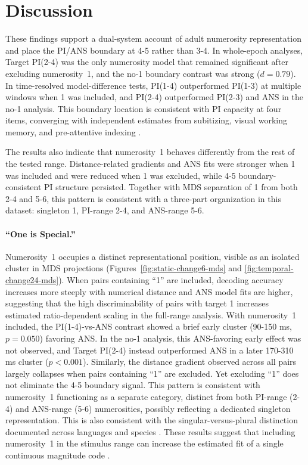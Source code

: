 \section{Discussion}
These findings support a dual-system account of adult numerosity
representation and place the PI/ANS boundary at 4-5 rather than 3-4.
In whole-epoch analyses, Target PI(2-4) was the only numerosity model
that remained significant after excluding numerosity~1, and the no-1
boundary contrast was strong ($d = 0.79$). In time-resolved
model-difference tests, PI(1-4) outperformed PI(1-3) at multiple
windows when 1 was included, and PI(2-4) outperformed PI(2-3) and ANS
in the no-1 analysis. This boundary location is consistent with PI
capacity at four items, converging with independent estimates from
subitizing, visual working memory, and pre-attentive indexing
\citep{Cowan2001,LuckVogel1997,TrickPylyshyn1994}.

The results also indicate that numerosity~1 behaves differently from
the rest of the tested range. Distance-related gradients and ANS fits
were stronger when 1 was included and were reduced when 1 was excluded,
while 4-5 boundary-consistent PI structure persisted. Together with MDS
separation of 1 from both 2-4 and 5-6, this pattern is consistent with
a three-part organization in this dataset: singleton 1, PI-range 2-4,
and ANS-range 5-6.

\paragraph{``One is Special.''}
Numerosity~1 occupies a distinct representational position, visible as
an isolated cluster in MDS projections
(Figures~\ref{fig:static-change6-mds} and \ref{fig:temporal-change24-mds}). When pairs containing ``1'' are
included, decoding accuracy increases more steeply with numerical distance
and ANS model fits are higher, suggesting that the high discriminability
of pairs with target 1 increases estimated ratio-dependent scaling in
the full-range analysis.
With numerosity~1 included, the PI(1-4)-vs-ANS contrast showed a brief
early cluster (90-150 ms, $p = 0.050$) favoring ANS. In the no-1
analysis, this ANS-favoring early effect was not observed, and Target
PI(2-4) instead outperformed ANS in a later 170-310 ms cluster
($p < 0.001$). Similarly,
the distance gradient observed across all pairs largely
collapses when pairs containing ``1'' are excluded. Yet excluding ``1''
does not eliminate the 4-5 boundary signal. This pattern is consistent
with numerosity~1 functioning as a separate category, distinct from
both PI-range (2-4) and ANS-range (5-6) numerosities, possibly
reflecting a dedicated singleton representation. This is also
consistent with the singular-versus-plural distinction documented
across languages and species
\citep{Barner2007,Barner2008,Li2009}. These results suggest
that including numerosity~1 in the stimulus range can increase the estimated fit
of a single continuous magnitude code
\citep[see][]{GallistelGelman2000}.

